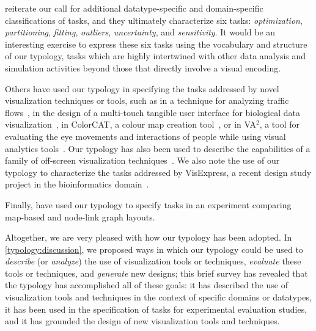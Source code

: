 \citet{Sedlmair2014} reiterate our call for additional datatype-specific and domain-specific classifications of tasks, and they ultimately characterize six tasks: {\it optimization}, {\it partitioning}, {\it fitting}, {\it outliers}, {\it uncertainty}, and {\it sensitivity}. 
It would be an interesting exercise to express these six tasks using the vocabulary and structure of our typology, tasks which are highly intertwined with other data analysis and simulation activities beyond those that directly involve a visual encoding.

Others have used our typology in specifying the tasks addressed by novel visualization techniques or tools, such as in a technique for analyzing traffic flows~\cite{Scheepens2015}, in the design of a multi-touch tangible user interface for biological data visualization~\cite{Almegren2016}, in ColorCAT, a colour map creation tool~\cite{Mittelstadt2015}, or in VA$^2$, a tool for evaluating the eye movements and interactions of people while using visual analytics tools~\cite{Blascheck2015}.
Our typology has also been used to describe the capabilities of a family of off-screen visualization techniques~\cite{Jackle2015}.
We also note the use of our typology to characterize the tasks addressed by VisExpress, a recent design study project in the bioinformatics domain~\cite{Simon2015}.

Finally, 
\citet{Saket2015} have used our typology to specify tasks in an experiment comparing map-based and node-link graph layouts.

Altogether, we are very pleased with how our typology has been adopted.
In \autoref{typology:discussion}, we proposed ways in which our typology could be used to {\it describe} (or {\it analyze}) the use of visualization tools or techniques, {\it evaluate} these tools or techniques, and {\it generate} new designs; this brief survey has revealed that the typology has accomplished all of these goals: it has described the use of visualization tools and techniques in the context of specific domains or datatypes, it has been used in the specification of tasks for experimental evaluation studies, and it has grounded the design of new visualization tools and techniques.

